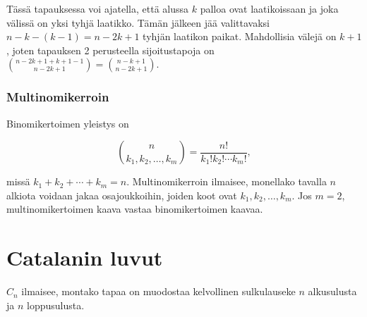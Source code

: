 \begin{center}
\end{center}

Tässä tapauksessa voi ajatella, että alussa $k$ palloa
ovat laatikoissaan ja joka välissä on yksi tyhjä laatikko.
Tämän jälkeen jää valittavaksi $n-k-(k-1)=n-2k+1$ tyhjän laatikon paikat.
Mahdollisia välejä on $k+1$, joten tapauksen 2 perusteella
sijoitustapoja on ${n-2k+1+k+1-1 \choose n-2k+1} = {n-k+1 \choose n-2k+1}$.

\subsubsection{Multinomikerroin}


Binomikertoimen yleistys on 

\[ {n \choose k_1,k_2,\ldots,k_m} = \frac{n!}{k_1! k_2! \cdots k_m!}, \]

missä $k_1+k_2+\cdots+k_m=n$.
Multinomikerroin ilmaisee, monellako tavalla $n$ alkiota voidaan jakaa osajoukkoihin,
joiden koot ovat $k_1,k_2,\ldots,k_m$.
Jos $m=2$, multinomikertoimen kaava vastaa binomikertoimen kaavaa.

\section{Catalanin luvut}


 $C_n$ ilmaisee,
montako tapaa on muodostaa kelvollinen sulkulauseke
$n$ alkusulusta ja $n$ loppusulusta.

